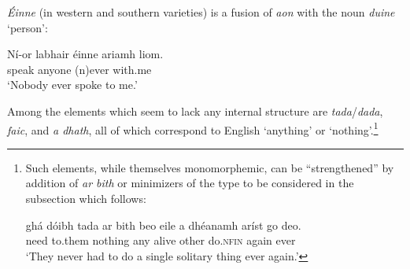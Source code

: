 \documentclass[output=paper,colorlinks,citecolor=brown]{langscibook}
\begin{document}

\textit{Éinne} (in western and southern varieties) is a fusion of \textit{aon} with the noun \textit{duine} `person':

\ea
\gll Ní-or labhair éinne ariamh liom. \\          
     {\nior} {speak\past} anyone (n)ever {with.me} \\
\glt `Nobody ever spoke to me.'
\z


Among the elements which seem to lack any internal structure are \textit{tada}/{\itshape dada}, \textit{faic}, and \textit{a dhath}, all of which correspond to English `anything' or `nothing'.\footnote{Such elements, while themselves monomorphemic, can be “strengthened” by addition of \textit{ar bith} or minimizers of the type to be considered in the subsection which follows:

\ea
{} ghá dóibh tada {ar bith} beo eile {a dhéanamh} aríst {go deo}. \\
     {\nior} need  {to.them} nothing any alive other {do.\textsc{nfin}} again ever \\
\glt `They never had to do a single solitary thing ever
     again.'
\z
}
\end{document}
